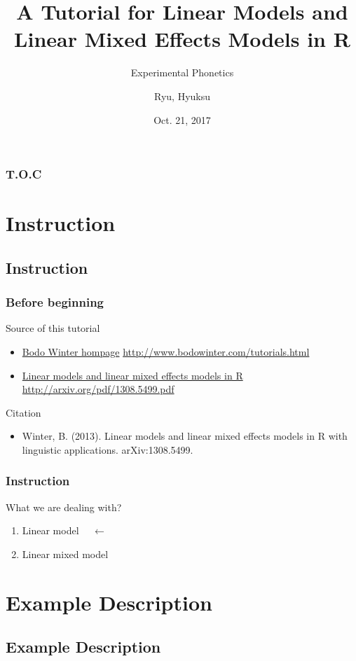 \documentclass[10p]{beamer}\usepackage[]{graphicx}\usepackage[]{color}
\author{Ryu, Hyuksu}
\institute{Naver Clova}
\title{A Tutorial for Linear Models and Linear Mixed Effects Models in R}
\subtitle{Experimental Phonetics}
\date{Oct. 21, 2017}
\begin{document}
\begin{frame}
\maketitle
\end{frame}

\begin{frame}
\frametitle{T.O.C}
	\tableofcontents[subsectionstyle=hide]
\end{frame}

\section{Instruction}
\subsection{Instruction}

\begin{frame}
\frametitle{Before beginning}
Source of this tutorial
\begin{itemize}
  \item \href{http://www.bodowinter.com/tutorials.html}{Bodo Winter hompage} 
  \url{http://www.bodowinter.com/tutorials.html}
  \item \href{http://arxiv.org/pdf/1308.5499.pdf}{Linear models and linear mixed effects models in R}
  \url{http://arxiv.org/pdf/1308.5499.pdf}
\end{itemize}
\vspace{9pt}
Citation
\begin{itemize}
  \item Winter, B. (2013). Linear models and linear mixed effects models in R with linguistic applications. arXiv:1308.5499. 
\end{itemize}
\end{frame}


\begin{frame}
\frametitle{Instruction}
What we are dealing with?
\begin{enumerate}
\item \alert{Linear model} $\quad \leftarrow$
\item Linear mixed model
\end{enumerate}
\end{frame}

\section{Example Description}
\subsection{Example Description}
\end{document}
